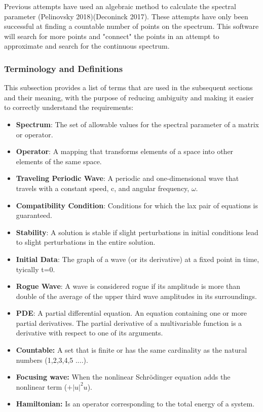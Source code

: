 \documentclass[12pt]{article}
\begin{document}
Previous attempts have used an algebraic method to calculate the spectral 
parameter (Pelinovsky 2018)(Deconinck 2017). These attempts have only been 
successful at finding a countable number of points on the spectrum. This 
software will 
search for more points and "connect"  the points in an attempt to approximate 
and search for the continuous spectrum.  

\subsubsection{Terminology and  Definitions}

This subsection provides a list of terms that are used in the subsequent
sections and their meaning, with the purpose of reducing ambiguity and making it
easier to correctly understand the requirements:

\begin{itemize}

\item \textbf{Spectrum}: The set of allowable values for the spectral parameter 
of a matrix or operator.
\item \textbf{Operator}: A mapping that transforms elements of a space into 
other elements of the same space. 
\item \textbf{Traveling Periodic Wave}: A periodic and one-dimensional wave 
that travels with a constant speed, c, and angular frequency, $\omega$. 
\item \textbf{Compatibility Condition}: Conditions for which the lax pair of 
equations is guaranteed. 
\item \textbf{Stability}: A solution is stable if slight perturbations in 
initial conditions lead 
to slight perturbations in the entire solution.
\item \textbf{Initial Data}: The graph of a wave (or its derivative) 
at a fixed point in time, tyically t=0.
\item \textbf{Rogue Wave}: A wave is considered rogue if its amplitude is more 
than double of the average of the upper third wave amplitudes in its 
surroundings. 
\item \textbf{PDE}: A partial differential equation. An equation containing one 
or more partial derivatives. The partial derivative of a multivariable function 
is a derivative with respect to one of its arguments. 
\item \textbf{Countable:} A set that is finite or has the same cardinality as 
the natural numbers (1,2,3,4,5 ....). 
\item \textbf{Focusing wave:} When the nonlinear Schr\"{o}dinger equation adds 
the 
nonlinear term ($+|u|^{2}u$).  
\item \textbf{Hamiltonian:} Is an operator corresponding to the total energy of 
a system. 

\end{itemize}
\end{document}

